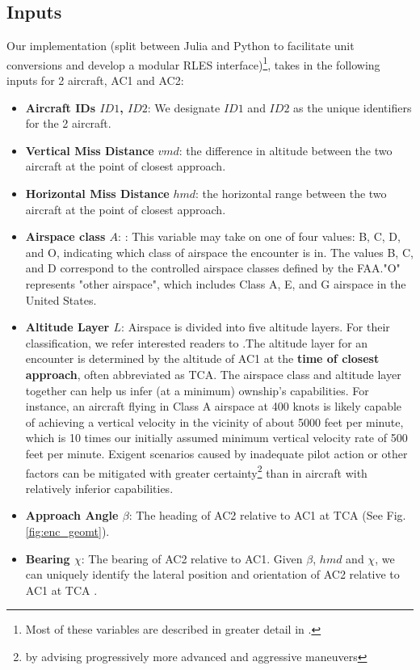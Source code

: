 \documentclass[journal, a4paper]{IEEEtran}
\begin{document}
   \subsection{Inputs}
   Our implementation (split between Julia and Python to facilitate unit conversions and develop a modular RLES interface)\footnote{Most of these variables are described in greater detail in \cite{correncmod}.}, takes in the following inputs for 2 aircraft, AC1 and AC2:
   \begin{itemize}
   \item \textbf{Aircraft IDs $ID1$, $ID2$}: We designate $ID1$ and $ID2$ as the unique identifiers for the 2 aircraft. 
   \item \textbf{Vertical Miss Distance} $vmd$: the difference in altitude
between the two aircraft at the point of closest approach.
   \item \textbf{Horizontal Miss Distance} $hmd$: the horizontal range
between the two aircraft at the point of closest approach.
   \item \textbf{Airspace class $A$}: : This variable may take on one of four values: B, C, D, and O, indicating which class of airspace the encounter is in. The values B, C, and D correspond to the controlled airspace classes defined by the FAA."O" represents "other airspace", which includes Class A, E, and G airspace in the United States.
   \item \textbf{Altitude Layer $L$}: Airspace is divided into five altitude layers. For their classification, we refer interested readers to \cite{correncmod}.The altitude layer for an encounter is determined
by the altitude of AC1 at the \textbf{time of closest approach}, often abbreviated as TCA. The airspace class and altitude layer together can help us infer (at a minimum) ownship's capabilities. For instance, an aircraft flying in Class A airspace at 400 knots is likely capable of achieving a vertical velocity in the vicinity of about 5000 feet per minute, which is 10 times our initially assumed minimum vertical velocity rate of 500 feet per minute. Exigent scenarios caused by inadequate pilot action or other factors can be mitigated with greater certainty\footnote{by advising progressively more advanced and aggressive maneuvers} than in aircraft with relatively inferior capabilities.
   \item \textbf{Approach Angle $\beta$}: The heading of AC2 relative to AC1 at TCA (See Fig. \ref{fig:enc_geomt}). 
   \item \textbf{Bearing $\chi$}: The bearing of AC2 relative to AC1. Given $\beta$, $hmd$ and $\chi$, we can uniquely identify the lateral position and orientation of AC2 relative to AC1 at TCA \cite{correncmod}.

\end{itemize}
\end{document}
